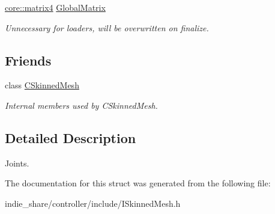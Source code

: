 \begin{DoxyCompactItemize}
\mbox{\label{structirr_1_1scene_1_1ISkinnedMesh_1_1SJoint_a633203c1f514622febdad45edd06b9a5}} 
\hyperlink{namespaceirr_1_1core_a4c9d4e29899535971052810954a14431}{core\+::matrix4} \hyperlink{structirr_1_1scene_1_1ISkinnedMesh_1_1SJoint_a633203c1f514622febdad45edd06b9a5}{Global\+Matrix}
\begin{DoxyCompactList}\small\item\em Unnecessary for loaders, will be overwritten on finalize. \end{DoxyCompactList}\end{DoxyCompactItemize}
\subsection*{Friends}
\begin{DoxyCompactItemize}
\item 
\mbox{\label{structirr_1_1scene_1_1ISkinnedMesh_1_1SJoint_a98554561a5c71bdc9be78be1a91d1a08}} 
class \hyperlink{structirr_1_1scene_1_1ISkinnedMesh_1_1SJoint_a98554561a5c71bdc9be78be1a91d1a08}{C\+Skinned\+Mesh}
\begin{DoxyCompactList}\small\item\em Internal members used by C\+Skinned\+Mesh. \end{DoxyCompactList}\end{DoxyCompactItemize}


\subsection{Detailed Description}
Joints. 

The documentation for this struct was generated from the following file\+:\begin{DoxyCompactItemize}
\item 
indie\+\_\+share/controller/include/I\+Skinned\+Mesh.\+h\end{DoxyCompactItemize}
